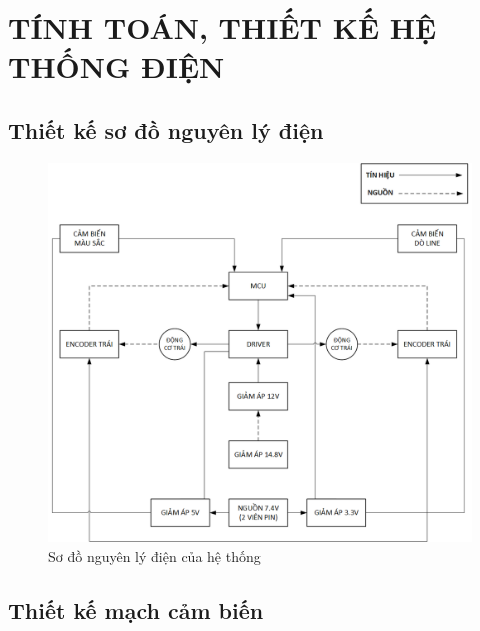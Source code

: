 \chapter{TÍNH TOÁN, THIẾT KẾ HỆ THỐNG ĐIỆN}
    \section{Thiết kế sơ đồ nguyên lý điện}
        \begin{figure}[H]
            \centering
            \includegraphics[width=1\textwidth]{pictures/chapter4/c4_p1_ElectricalFlow.png}
            \caption{Sơ đồ nguyên lý điện của hệ thống}
            \label{fig:4-1}
        \end{figure}
    \section{Thiết kế mạch cảm biến}
